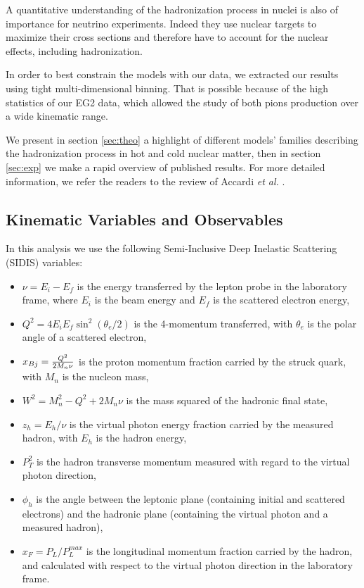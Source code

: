 A quantitative understanding of the hadronization process in nuclei is also of importance for neutrino experiments. Indeed they use nuclear targets to maximize their cross sections and therefore have to account for the nuclear effects, including hadronization. 

In order to best constrain the models with our data, we extracted our results using tight multi-dimensional binning. That is possible because of the high statistics of our EG2 data, which allowed the study of both pions production over a wide kinematic range.

We present in section \ref{sec:theo} a highlight of different models' families describing the hadronization process in hot and cold nuclear matter, then in section \ref{sec:exp} we make a rapid overview of published results. For more detailed information, we refer the readers to the review of Accardi {\it et al.} \cite{Accardi:2009qv}.


\subsection{Kinematic Variables and Observables}

In this analysis we use the following Semi-Inclusive Deep Inelastic Scattering (SIDIS) variables:
\begin{itemize}
 \item $\nu = E_i - E_f$ is the energy transferred by the lepton probe in the laboratory frame, where $E_i$ is the beam energy and $E_f$ is the scattered electron energy,
 \item $Q^2 = 4 E_i E_f \sin ^2(\theta_e / 2)$ is the 4-momentum transferred, with $\theta_e$ is the polar angle of a scattered electron,
 \item $x_{Bj} = {{Q^2} \over {2 M_n \nu}}$ is the proton momentum fraction carried by the struck quark, with $M_n$ is the nucleon mass,
 \item $W^2 = M_n^2 - Q^2 + 2 M_n \nu$ is the mass squared of the hadronic final state,
 \item $z_h = E_h / \nu$ is the virtual photon energy fraction carried by the measured hadron, with $E_h$ is the hadron energy,
 \item $P_T^2$ is the hadron transverse momentum measured with regard to the virtual photon direction,
 \item $\phi_h$ is the angle between the leptonic plane (containing initial and scattered electrons) and the hadronic plane (containing the virtual photon and a measured hadron),
 \item $x_F = P_L/P_L^{max}$ is the longitudinal momentum fraction carried by the hadron, and calculated with respect to the virtual photon direction in the laboratory frame.
\end{itemize}

